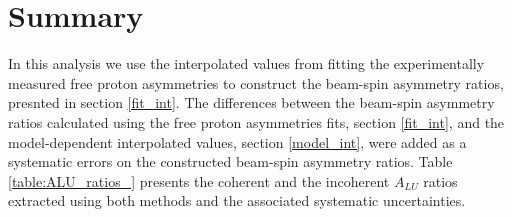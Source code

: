 \section{Summary}
In this analysis we use the interpolated values from fitting the experimentally 
measured free proton asymmetries to construct the beam-spin asymmetry ratios, 
presnted in section \ref{fit_int}.  The differences between the beam-spin 
asymmetry ratios calculated using the free proton asymmetries fits, section 
\ref{fit_int}, and the model-dependent interpolated values, section 
\ref{model_int}, were added as a systematic errors on the constructed beam-spin 
asymmetry ratios.  Table \ref{table:ALU_ratios_} presents the coherent and the 
incoherent $A_{LU}$ ratios extracted using both methods and the associated 
systematic uncertainties.

\small
